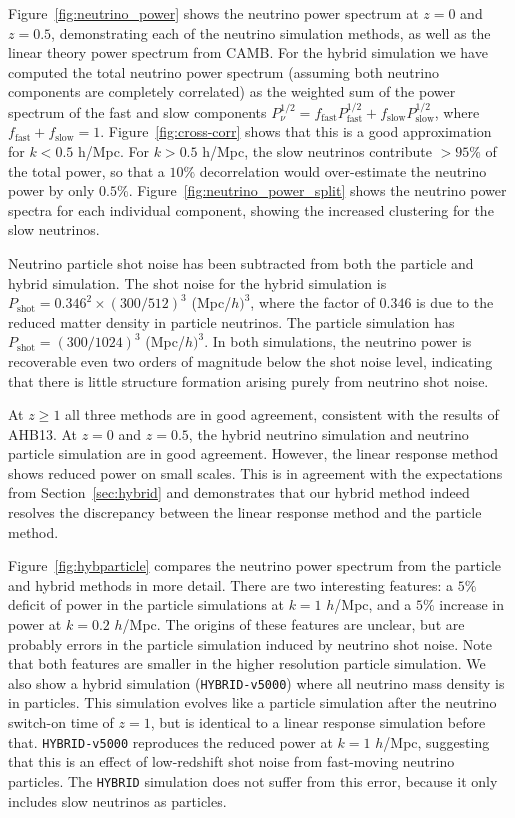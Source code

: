 \documentclass[useAMS, usenatbib]{mnras}
\begin{document}
Figure~\ref{fig:neutrino_power} shows the neutrino power spectrum at $z=0$ and $z=0.5$, demonstrating each of the neutrino simulation methods, as well as the linear theory power spectrum from CAMB. For the hybrid simulation we have computed the total neutrino power spectrum (assuming both neutrino components are completely correlated) as the weighted sum of the power spectrum of the fast and slow components $P^{1/2}_\nu = f_\mathrm{fast} P^{1/2}_\mathrm{fast} + f_\mathrm{slow} P^{1/2}_\mathrm{slow}$, where $f_\mathrm{fast} + f_\mathrm{slow} = 1$. Figure~\ref{fig:cross-corr} shows that this is a good approximation for $k < 0.5$ h/Mpc. For $k > 0.5$ h/Mpc, the slow neutrinos contribute $> 95\%$ of the total power, so that a $10\%$ decorrelation would over-estimate the neutrino power by only $0.5\%$. Figure~\ref{fig:neutrino_power_split} shows the neutrino power spectra for each individual component, showing the increased clustering for the slow neutrinos.

Neutrino particle shot noise has been subtracted from both the particle and hybrid simulation. The shot noise for the hybrid simulation is $P_\mathrm{shot} = 0.346^2\times (300 /512)^3 $ (Mpc/$h)^3$, where the factor of $0.346$ is due to the reduced matter density in particle neutrinos. The particle simulation has $P_\mathrm{shot} = (300 /1024)^3$ (Mpc/$h)^3$. In both simulations, the neutrino power is recoverable even two orders of magnitude below the shot noise level, indicating that there is little structure formation arising purely from neutrino shot noise.


At $z \geq 1$ all three methods are in good agreement, consistent with the results of AHB13. At $z = 0$ and $z=0.5$, the hybrid neutrino simulation and neutrino particle simulation are in good agreement. However, the linear response method shows reduced power on small scales. This is in agreement with the expectations from Section~\ref{sec:hybrid} and demonstrates that our hybrid method indeed resolves the discrepancy between the linear response method and the particle method.

Figure~\ref{fig:hybparticle} compares the neutrino power spectrum from the particle and hybrid methods in more detail. There are two interesting features: a $5\%$ deficit of power in the particle simulations at $k=1$ $h$/Mpc, and a $5\%$ increase in power at $k=0.2$ $h$/Mpc. The origins of these features are unclear, but are probably errors in the particle simulation induced by neutrino shot noise. Note that both features are smaller in the higher resolution particle simulation. We also show a hybrid simulation (\texttt{HYBRID-v5000}) where all neutrino mass density is in particles. This simulation evolves like a particle simulation after the neutrino switch-on time of $z=1$, but is identical to a linear response simulation before that. \texttt{HYBRID-v5000} reproduces the reduced power at $k=1$ $h$/Mpc, suggesting that this is an effect of low-redshift shot noise from fast-moving neutrino particles. The \texttt{HYBRID} simulation does not suffer from this error, because it only includes slow neutrinos as particles.
\end{document}
